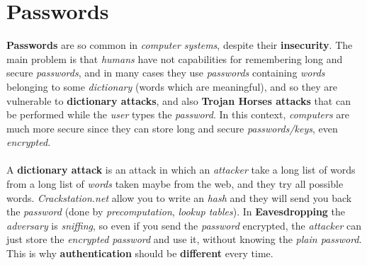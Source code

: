 \documentclass{article}
\begin{document}
\section{Passwords}
\textbf{Passwords} are so common in \emph{computer systems}, despite their \textbf{insecurity}. The main problem is that \emph{humans} have not capabilities for remembering long and secure \emph{passwords}, and in many cases they use \emph{passwords} containing \emph{words} belonging to some \emph{dictionary} (words which are meaningful), and so they are vulnerable to \textbf{dictionary attacks}, and also \textbf{Trojan Horses attacks} that can be performed while the \emph{user} types the \emph{password}. In this context, \emph{computers} are much more secure since they can store long and secure \emph{passwords/keys}, even \emph{encrypted}. \\\\
A \textbf{dictionary attack} is an attack in which an \emph{attacker} take a long list of words from a long list of \emph{words} taken maybe from the web, and they try all possible words. \emph{Crackstation.net} allow you to write an \emph{hash} and they will send you back the \emph{password} (done by \emph{precomputation}, \emph{lookup tables}). In \textbf{Eavesdropping} the \emph{adversary} is \emph{sniffing}, so even if you send the \emph{password} encrypted, the \emph{attacker} can just store the \emph{encrypted password} and use it, without knowing the \emph{plain password}. This is why \textbf{authentication} should be \textbf{different} every time. 
\end{document}
